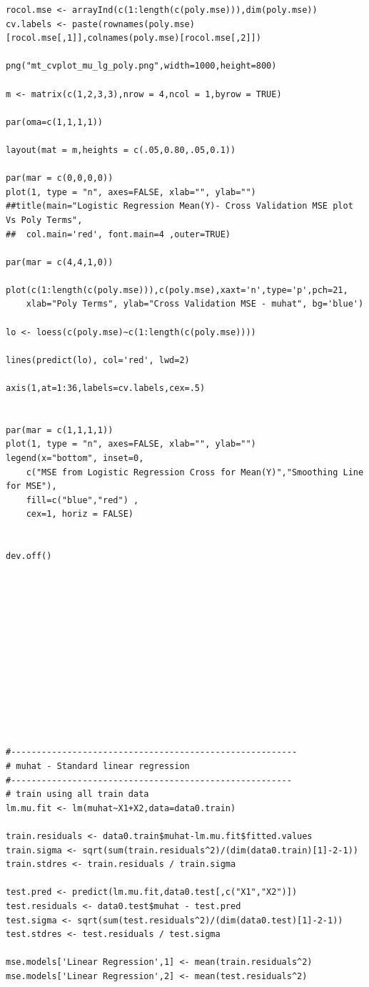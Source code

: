 \documentclass[twoside,12pt]{article}
\begin{document}
\begin{verbatim}
rocol.mse <- arrayInd(c(1:length(c(poly.mse))),dim(poly.mse))
cv.labels <- paste(rownames(poly.mse)[rocol.mse[,1]],colnames(poly.mse)[rocol.mse[,2]])

png("mt_cvplot_mu_lg_poly.png",width=1000,height=800)

m <- matrix(c(1,2,3,3),nrow = 4,ncol = 1,byrow = TRUE)

par(oma=c(1,1,1,1))

layout(mat = m,heights = c(.05,0.80,.05,0.1))

par(mar = c(0,0,0,0))
plot(1, type = "n", axes=FALSE, xlab="", ylab="")
##title(main="Logistic Regression Mean(Y)- Cross Validation MSE plot Vs Poly Terms", 
##	col.main='red', font.main=4 ,outer=TRUE)

par(mar = c(4,4,1,0))

plot(c(1:length(c(poly.mse))),c(poly.mse),xaxt='n',type='p',pch=21,
	xlab="Poly Terms", ylab="Cross Validation MSE - muhat", bg='blue')

lo <- loess(c(poly.mse)~c(1:length(c(poly.mse))))

lines(predict(lo), col='red', lwd=2)

axis(1,at=1:36,labels=cv.labels,cex=.5)


par(mar = c(1,1,1,1))
plot(1, type = "n", axes=FALSE, xlab="", ylab="")
legend(x="bottom", inset=0, 
	c("MSE from Logistic Regression Cross for Mean(Y)","Smoothing Line for MSE"),
	fill=c("blue","red") ,
	cex=1, horiz = FALSE)


dev.off()













#--------------------------------------------------------
# muhat - Standard linear regression
#-------------------------------------------------------
# train using all train data
lm.mu.fit <- lm(muhat~X1+X2,data=data0.train)

train.residuals <- data0.train$muhat-lm.mu.fit$fitted.values
train.sigma <- sqrt(sum(train.residuals^2)/(dim(data0.train)[1]-2-1))
train.stdres <- train.residuals / train.sigma

test.pred <- predict(lm.mu.fit,data0.test[,c("X1","X2")])
test.residuals <- data0.test$muhat - test.pred
test.sigma <- sqrt(sum(test.residuals^2)/(dim(data0.test)[1]-2-1))
test.stdres <- test.residuals / test.sigma

mse.models['Linear Regression',1] <- mean(train.residuals^2)
mse.models['Linear Regression',2] <- mean(test.residuals^2)


\end{verbatim}
\end{document}
